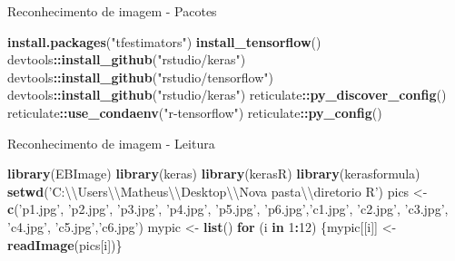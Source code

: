 \documentclass[
  ignorenonframetext,
]{beamer}
\newenvironment{Shaded}{\begin{snugshade}}{\end{snugshade}}
\newcommand{\CharTok}[1]{\textcolor[rgb]{0.31,0.60,0.02}{#1}}
\newcommand{\ControlFlowTok}[1]{\textcolor[rgb]{0.13,0.29,0.53}{\textbf{#1}}}
\newcommand{\DecValTok}[1]{\textcolor[rgb]{0.00,0.00,0.81}{#1}}
\newcommand{\KeywordTok}[1]{\textcolor[rgb]{0.13,0.29,0.53}{\textbf{#1}}}
\newcommand{\NormalTok}[1]{#1}
\newcommand{\OperatorTok}[1]{\textcolor[rgb]{0.81,0.36,0.00}{\textbf{#1}}}
\newcommand{\StringTok}[1]{\textcolor[rgb]{0.31,0.60,0.02}{#1}}
\begin{document}
\begin{frame}[fragile]{Reconhecimento de imagem - Pacotes}
\protect\hypertarget{reconhecimento-de-imagem---pacotes}{}

\begin{Shaded}
\begin{Highlighting}[]
\KeywordTok{install.packages}\NormalTok{(}\StringTok{"tfestimators"}\NormalTok{)}
\KeywordTok{install_tensorflow}\NormalTok{()}
\NormalTok{devtools}\OperatorTok{::}\KeywordTok{install_github}\NormalTok{(}\StringTok{"rstudio/keras"}\NormalTok{)}
\NormalTok{devtools}\OperatorTok{::}\KeywordTok{install_github}\NormalTok{(}\StringTok{"rstudio/tensorflow"}\NormalTok{)}
\NormalTok{devtools}\OperatorTok{::}\KeywordTok{install_github}\NormalTok{(}\StringTok{"rstudio/keras"}\NormalTok{)}
\NormalTok{reticulate}\OperatorTok{::}\KeywordTok{py_discover_config}\NormalTok{()}
\NormalTok{reticulate}\OperatorTok{::}\KeywordTok{use_condaenv}\NormalTok{(}\StringTok{"r-tensorflow"}\NormalTok{)}
\NormalTok{reticulate}\OperatorTok{::}\KeywordTok{py_config}\NormalTok{()}
\end{Highlighting}
\end{Shaded}

\end{frame}

\begin{frame}[fragile]{Reconhecimento de imagem - Leitura}
\protect\hypertarget{reconhecimento-de-imagem---leitura}{}

\begin{Shaded}
\begin{Highlighting}[]
\KeywordTok{library}\NormalTok{(EBImage)}
\KeywordTok{library}\NormalTok{(keras)}
\KeywordTok{library}\NormalTok{(kerasR)}
\KeywordTok{library}\NormalTok{(kerasformula)}
\KeywordTok{setwd}\NormalTok{(}\StringTok{'C:}\CharTok{\textbackslash{}\textbackslash{}}\StringTok{Users}\CharTok{\textbackslash{}\textbackslash{}}\StringTok{Matheus}\CharTok{\textbackslash{}\textbackslash{}}\StringTok{Desktop}\CharTok{\textbackslash{}\textbackslash{}}\StringTok{Nova pasta}\CharTok{\textbackslash{}\textbackslash{}}\StringTok{diretorio R'}\NormalTok{)}
\NormalTok{pics <-}\StringTok{ }\KeywordTok{c}\NormalTok{(}\StringTok{'p1.jpg'}\NormalTok{, }\StringTok{'p2.jpg'}\NormalTok{, }\StringTok{'p3.jpg'}\NormalTok{, }\StringTok{'p4.jpg'}\NormalTok{, }\StringTok{'p5.jpg'}\NormalTok{,}
          \StringTok{'p6.jpg'}\NormalTok{,}\StringTok{'c1.jpg'}\NormalTok{, }\StringTok{'c2.jpg'}\NormalTok{, }\StringTok{'c3.jpg'}\NormalTok{, }\StringTok{'c4.jpg'}\NormalTok{, }
          \StringTok{'c5.jpg'}\NormalTok{,}\StringTok{'c6.jpg'}\NormalTok{)}
\NormalTok{mypic <-}\StringTok{ }\KeywordTok{list}\NormalTok{()}
\ControlFlowTok{for}\NormalTok{ (i }\ControlFlowTok{in} \DecValTok{1}\OperatorTok{:}\DecValTok{12}\NormalTok{) \{mypic[[i]] <-}\StringTok{ }\KeywordTok{readImage}\NormalTok{(pics[i])\}}
\end{Highlighting}
\end{Shaded}

\end{frame}
\end{document}
